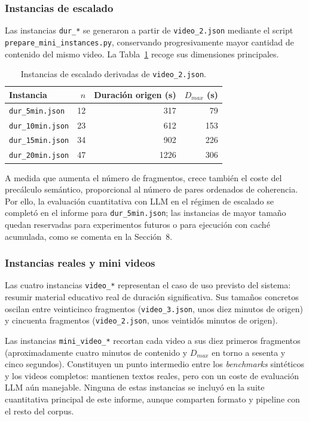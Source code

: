 \documentclass[12pt,a4paper]{article}
\begin{document}
\subsubsection{Instancias de escalado}

Las instancias \texttt{dur\_*} se generaron a partir de \texttt{video\_2.json} mediante el script \texttt{prepare\_mini\_instances.py}, conservando progresivamente mayor cantidad de contenido del mismo video. La Tabla~\ref{tab:escalado} recoge sus dimensiones principales.

\begin{table}[H]
\centering
\caption{Instancias de escalado derivadas de \texttt{video\_2.json}.}
\label{tab:escalado}
\begin{tabular}{@{}lrrr@{}}
\toprule
\textbf{Instancia} & \textbf{\(n\)} & \textbf{Duración origen (s)} & \textbf{\(D_{max}\) (s)} \\
\midrule
\texttt{dur\_5min.json}  & 12 & 317 & 79 \\
\texttt{dur\_10min.json} & 23 & 612 & 153 \\
\texttt{dur\_15min.json} & 34 & 902 & 226 \\
\texttt{dur\_20min.json} & 47 & 1226 & 306 \\
\bottomrule
\end{tabular}
\end{table}

A medida que aumenta el número de fragmentos, crece también el coste del precálculo semántico, proporcional al número de pares ordenados de coherencia. Por ello, la evaluación cuantitativa con LLM en el régimen de escalado se completó en el informe para \texttt{dur\_5min.json}; las instancias de mayor tamaño quedan reservadas para experimentos futuros o para ejecución con caché acumulada, como se comenta en la Sección~8.

\subsubsection{Instancias reales y mini videos}

Las cuatro instancias \texttt{video\_*} representan el caso de uso previsto del sistema: resumir material educativo real de duración significativa. Sus tamaños concretos oscilan entre veinticinco fragmentos (\texttt{video\_3.json}, unos diez minutos de origen) y cincuenta fragmentos (\texttt{video\_2.json}, unos veintidós minutos de origen).

Las instancias \texttt{mini\_video\_*} recortan cada video a sus diez primeros fragmentos (aproximadamente cuatro minutos de contenido y \(D_{max}\) en torno a sesenta y cinco segundos). Constituyen un punto intermedio entre los \textit{benchmarks} sintéticos y los videos completos: mantienen textos reales, pero con un coste de evaluación LLM aún manejable. Ninguna de estas instancias se incluyó en la suite cuantitativa principal de este informe, aunque comparten formato y pipeline con el resto del corpus.
\end{document}
